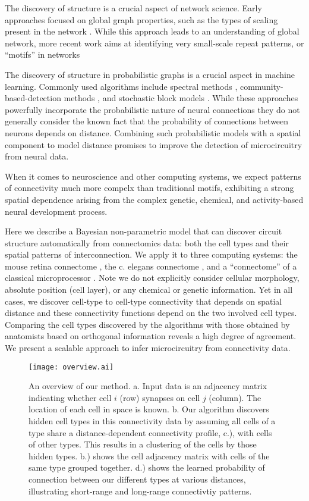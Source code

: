 \documentclass{article}
\begin{document}
The discovery of structure is a crucial aspect of network
science. Early approaches focused on global graph properties, such as
the types of scaling present in the network \autocite
{WattsStrogatz1998} .  While this approach leads to an understanding
of global network, more recent work aims at identifying very small-scale
repeat patterns, or “motifs” in networks\autocite{Milo2002}

The discovery of structure in probabilistic graphs is a crucial aspect
in machine learning. Commonly used algorithms include spectral methods
\autocite{},   community-based-detection   methods  \autocite{},   and
stochastic block  models \autocite{Nowicki2001}.  While these
approaches powerfully  incorporate the probabilistic nature of neural
connections \autocite{} they do not generally consider the known fact
that  the  probability  of  connections  between  neurons  depends  on
distance. Combining such probabilistic models with a spatial component
to model distance promises to  improve the detection of microcircuitry
from neural data.

When it comes to neuroscience and other computing systems, we expect
patterns of connectivity much more compelx than traditional motifs,
exhibiting a strong spatial dependence arising from the complex
genetic, chemical, and activity-based neural development process. 


Here we describe a Bayesian non-parametric model that can discover
circuit structure automatically from connectomics data: both the cell
types and their spatial patterns of interconnection. We apply it to
three computing systems: the mouse retina connectome \autocite{}, the
c. elegans connectome \autocite{}, and a ``connectome'' of a classical
microprocessor \autocite{James2010}. Note we do not explicitly
consider cellular morphology, absolute position (cell layer), or any
chemical or genetic information. Yet in all cases, we discover
cell-type to cell-type connectivity that depends on spatial distance
and these connectivity functions depend on the two involved cell
types. Comparing the cell types discovered by the algorithms with
those obtained by anatomists based on orthogonal information reveals a
high degree of agreement. We present a scalable approach to infer
microcircuitry from connectivity data.

\begin{figure}
  \centering 
    \centerline{\texttt{[image: overview.ai]}}
  \caption{An overview of our method. a. Input data is
an adjacency matrix indicating whether cell $i$ (row)
synapses on cell $j$ (column). The location of each cell in space is known. 
b. Our algorithm discovers hidden cell types in this connectivity data
by assuming all cells of a type share a distance-dependent connectivity 
profile, c.), with cells of other types. This results in a clustering 
of the cells by those hidden types. b.) shows the cell adjacency
matrix with cells of the same type grouped together. d.) shows
the learned probability of connection between our different types
at various distances, illustrating short-range and long-range
connectivtiy patterns.}
\label{fig:overview}
\end{figure}
\end{document}
